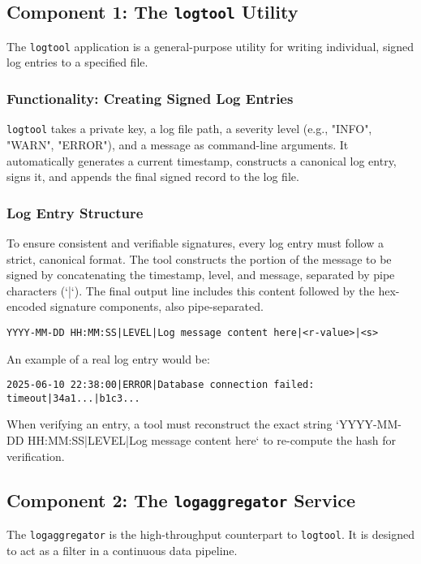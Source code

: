 \documentclass[12pt, letterpaper]{article}
\begin{document}
\subsection{Component 1: The \texttt{logtool} Utility}
The \texttt{logtool} application is a general-purpose utility for writing individual, signed log entries to a specified file.

\subsubsection{Functionality: Creating Signed Log Entries}
\texttt{logtool} takes a private key, a log file path, a severity level (e.g., "INFO", "WARN", "ERROR"), and a message as command-line arguments. It automatically generates a current timestamp, constructs a canonical log entry, signs it, and appends the final signed record to the log file.

\subsubsection{Log Entry Structure}
To ensure consistent and verifiable signatures, every log entry must follow a strict, canonical format. The tool constructs the portion of the message to be signed by concatenating the timestamp, level, and message, separated by pipe characters (`|`). The final output line includes this content followed by the hex-encoded signature components, also pipe-separated.

\begin{lstlisting}[caption={Canonical format of a signed log entry.}]
	YYYY-MM-DD HH:MM:SS|LEVEL|Log message content here|<r-value>|<s>
\end{lstlisting}
An example of a real log entry would be:
\begin{lstlisting}[]
	2025-06-10 22:38:00|ERROR|Database connection failed: timeout|34a1...|b1c3...
\end{lstlisting}
When verifying an entry, a tool must reconstruct the exact string `YYYY-MM-DD HH:MM:SS|LEVEL|Log message content here` to re-compute the hash for verification.

\subsection{Component 2: The \texttt{logaggregator} Service}
The \texttt{logaggregator} is the high-throughput counterpart to \texttt{logtool}. It is designed to act as a filter in a continuous data pipeline.
\end{document}
